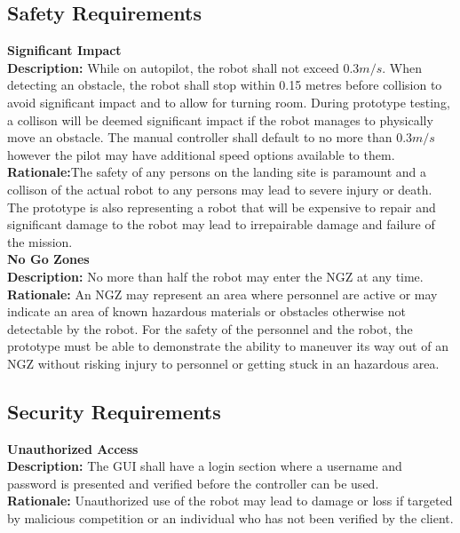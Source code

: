 \documentclass[10pt,a4paper,titlepage]{article}
\begin{document}
	\subsection{Safety Requirements}
		\textbf {Significant Impact}\\
		\textbf {Description:} While on autopilot, the robot shall not exceed \begin{math}0.3 m/s\end{math}. When detecting an obstacle, the robot shall stop within 0.15 metres before collision to avoid significant impact and to allow for turning room. During prototype testing, a collison will be deemed significant impact if the robot manages to physically move an obstacle. The manual controller shall default to no more than \begin{math}0.3 m/s\end{math} however the pilot may have additional speed options available to them.\\
		\textbf {Rationale:}The safety of any persons on the landing site is paramount and a collison of the actual robot to any persons may lead to severe injury or death. The prototype is also representing a robot that will be expensive to repair and significant damage to the robot may lead to irrepairable damage and failure of the mission.\\

		\textbf{No Go Zones}\\
		\textbf {Description:} No more than half the robot may enter the NGZ at any time.\\
		\textbf{Rationale:} An NGZ may represent an area where personnel are active or may indicate an area of known hazardous materials or obstacles otherwise not detectable by the robot. For the safety of the personnel and the robot, the prototype must be able to demonstrate the ability to maneuver its way out of an NGZ without risking injury to personnel or getting stuck in an hazardous area.\\
	\subsection{Security Requirements}
		\textbf {Unauthorized Access}\\

		\textbf {Description:} The GUI shall have a login section where a username and password is presented and verified before the controller can be used.\\
		\textbf{Rationale:} Unauthorized use of the robot may lead to damage or loss if targeted by malicious competition or an individual who has not been verified by the client.\\
 
\end{document}
